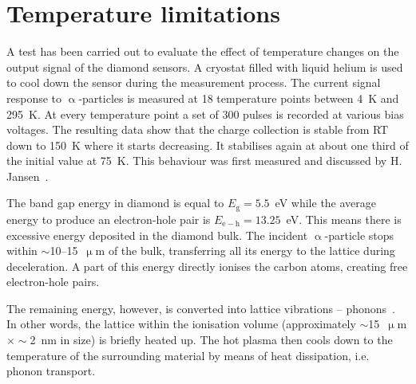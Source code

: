 \clearpage
\section{Temperature limitations}
\label{sec:templimit}
A test has been carried out to evaluate the effect of temperature changes on the output signal of the diamond sensors. A cryostat filled with liquid helium is used to cool down the sensor during the measurement process. The current signal response to $\upalpha$-particles is measured at 18 temperature points between 4~K and 295~K. At every temperature point a set of 300 pulses is recorded at various bias voltages. The resulting data show that the charge collection is stable from RT down to 150~K where it starts decreasing. It stabilises again at about one third of the initial value at 75~K. This behaviour was first measured and discussed by H. Jansen~\cite{Jansen:1956431}.

The band gap energy in diamond is equal to $E_\mathrm{g}=5.5$~eV while the average energy to produce an electron-hole pair is $E_{\mathrm{e-h}}=13.25$~eV. This means there is excessive energy deposited in the diamond bulk. The incident $\upalpha$-particle stops within $\sim$10--15~$\upmu$m of the bulk, transferring all its energy to the lattice during deceleration. A part of this energy directly ionises the carbon atoms, creating free electron-hole pairs. 

The remaining energy, however, is converted into lattice vibrations -- phonons~\cite{PhysRevLett.13.13, Jansen:1956431}. In other words, the lattice within the ionisation volume (approximately $\sim$15~$\upmu$m$\times\sim$2~nm in size) is briefly heated up. The hot plasma then cools down to the temperature of the surrounding material by means of heat dissipation, i.e. phonon transport.

